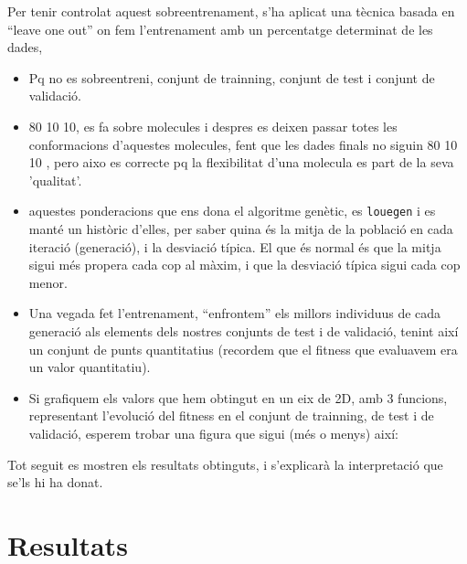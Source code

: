 \documentclass[titlepage,a4paper,12pt]{book}
\begin{document}
Per tenir controlat aquest sobreentrenament, s'ha aplicat una tècnica basada en
``leave one out'' on fem l'entrenament amb un percentatge determinat de les
dades, 

\begin{itemize}
	\item Pq no es sobreentreni, conjunt de trainning, conjunt de test i conjunt
		de validació.
	\item 80 10 10, es fa sobre molecules i despres es deixen passar totes les
		conformacions d'aquestes molecules, fent que les dades finals no siguin 80 10 10
		, pero aixo es correcte pq la flexibilitat d'una molecula es part de la seva
		'qualitat'.
	\item aquestes ponderacions que ens dona el algoritme genètic, es
		\texttt{louegen} i es manté un històric d'elles, per saber quina és la mitja
		de la població en cada iteració (generació), i la desviació típica.  El que
		és normal és que la mitja sigui més propera cada cop al màxim, i que la
		desviació típica sigui cada cop menor.
	\item Una vegada fet l'entrenament, ``enfrontem'' els millors individuus de
	cada generació als elements dels nostres conjunts de test i de validació,
	tenint així un conjunt de punts quantitatius (recordem que el fitness que
	evaluavem era un valor quantitatiu).
	\item Si grafiquem els valors que hem obtingut en un eix de 2D, amb 3
	funcions, representant l'evolució del fitness en el conjunt de trainning, de
	test i de validació, esperem trobar una figura que sigui (més o menys) així:
\end{itemize}
 
Tot seguit es mostren els resultats obtinguts, i s'explicarà la interpretació
que se'ls hi ha donat.



\section{Resultats} %
\label{sec:Resultats}

\end{document}
